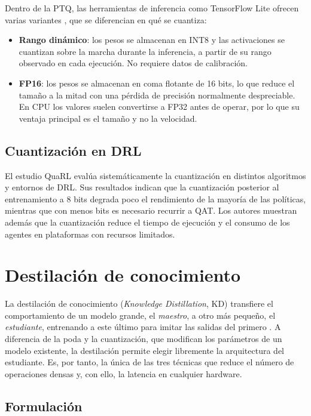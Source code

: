 Dentro de la PTQ, las herramientas de inferencia como TensorFlow Lite ofrecen varias variantes \cite{tflite_ptq}, que se diferencian en qué se cuantiza:
\begin{itemize}
	\item \textbf{Rango dinámico}: los pesos se almacenan en INT8 y las activaciones se cuantizan sobre la marcha durante la inferencia, a partir de su rango observado en cada ejecución. No requiere datos de calibración.
	\item \textbf{FP16}: los pesos se almacenan en coma flotante de 16 bits, lo que reduce el tamaño a la mitad con una pérdida de precisión normalmente despreciable. En CPU los valores suelen convertirse a FP32 antes de operar, por lo que su ventaja principal es el tamaño y no la velocidad.
\end{itemize}

\subsection{Cuantización en DRL}

El estudio QuaRL \cite{krishnan2022quarl} evalúa sistemáticamente la cuantización en distintos algoritmos y entornos de DRL. Sus resultados indican que la cuantización posterior al entrenamiento a 8 bits degrada poco el rendimiento de la mayoría de las políticas, mientras que con menos bits es necesario recurrir a QAT. Los autores muestran además que la cuantización reduce el tiempo de ejecución y el consumo de los agentes en plataformas con recursos limitados.

\section{Destilación de conocimiento}\label{sec:kd}

La destilación de conocimiento (\textit{Knowledge Distillation}, KD) transfiere el comportamiento de un modelo grande, el \textit{maestro}, a otro más pequeño, el \textit{estudiante}, entrenando a este último para imitar las salidas del primero \cite{hinton2015distilling,gou2021knowledge}. A diferencia de la poda y la cuantización, que modifican los parámetros de un modelo existente, la destilación permite elegir libremente la arquitectura del estudiante. Es, por tanto, la única de las tres técnicas que reduce el número de operaciones densas y, con ello, la latencia en cualquier hardware.

\subsection{Formulación}

